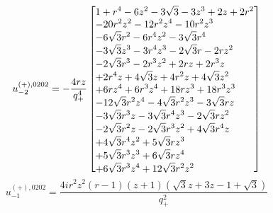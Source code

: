 \documentclass[11pt,a4paper]{article}
\begin{document}
\begin{equation}
u_{-2}^{(+),0202}=- \frac{4 r z}{q_{+}^{4}}\left[\vcenter{\hbox{\shortstack[l]{$\displaystyle 1 + r^{4} - 6 z^{2} - 3 \sqrt{3} - 3 z^{3} + 2 z + 2 r^{2}$\\
$\displaystyle  - 20 r^{2} z^{2} - 12 r^{2} z^{4} - 10 r^{2} z^{3}$\\
$\displaystyle  - 6 \sqrt{3} r^{2} - 6 r^{4} z^{2} - 3 \sqrt{3} r^{4}$\\
$\displaystyle  - 3 \sqrt{3} z^{3} - 3 r^{4} z^{3} - 2 \sqrt{3} r - 2 r z^{2}$\\
$\displaystyle  - 2 \sqrt{3} r^{3} - 2 r^{3} z^{2} + 2 r z + 2 r^{3} z$\\
$\displaystyle  + 2 r^{4} z + 4 \sqrt{3} z + 4 r^{2} z + 4 \sqrt{3} z^{2}$\\
$\displaystyle  + 6 r z^{4} + 6 r^{3} z^{4} + 18 r z^{3} + 18 r^{3} z^{3}$\\
$\displaystyle  - 12 \sqrt{3} r^{2} z^{4} - 4 \sqrt{3} r^{2} z^{3} - 3 \sqrt{3} r z$\\
$\displaystyle  - 3 \sqrt{3} r^{3} z - 3 \sqrt{3} r^{4} z^{3} - 2 \sqrt{3} r z^{2}$\\
$\displaystyle  - 2 \sqrt{3} r^{2} z - 2 \sqrt{3} r^{3} z^{2} + 4 \sqrt{3} r^{4} z$\\
$\displaystyle  + 4 \sqrt{3} r^{4} z^{2} + 5 \sqrt{3} r z^{3}$\\
$\displaystyle  + 5 \sqrt{3} r^{3} z^{3} + 6 \sqrt{3} r z^{4}$\\
$\displaystyle  + 6 \sqrt{3} r^{3} z^{4} + 12 \sqrt{3} r^{2} z^{2}$}}}\right]
\label{eq:cat-auxiliary-plus-0202-m2}
\end{equation}
\begin{equation}
u_{-1}^{(+),0202}=\frac{4 i r^{2} z^{2} \left(r - 1\right) \left(z + 1\right) \left(\sqrt{3} z + 3 z - 1 + \sqrt{3}\right)}{q_{+}^{2}}
\label{eq:cat-auxiliary-plus-0202-m1}
\end{equation}
\end{document}
